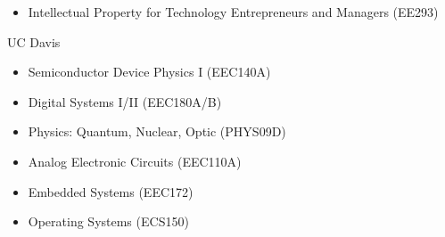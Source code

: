 \begin{cvcourses}
{\begin{multicols}{3}
\begin{itemize}
          \item Intellectual Property for Technology Entrepreneurs and Managers (EE293) %
        \end{itemize}
      \end{multicols}
    }
  \cvcourselist
    {UC Davis} %
    {
      \begin{multicols}{3}
        \begin{itemize}
          \item Semiconductor Device Physics I (EEC140A) %
          \item Digital Systems I/II (EEC180A/B) %
          \item Physics: Quantum, Nuclear, Optic (PHYS09D) %
          \item Analog Electronic Circuits (EEC110A) %
          \item Embedded Systems (EEC172) %
          \item Operating Systems (ECS150) %

\end{itemize}
\end{multicols}}
\end{cvcourses}
